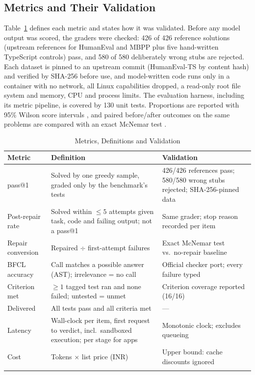 \documentclass[pdflatex,sn-mathphys-num]{sn-jnl}%
\newcommand{\fix}[1]{{\color{fixcol}#1}}
\theoremstyle{thmstyleone}%
\theoremstyle{thmstyletwo}%
\theoremstyle{thmstylethree}%
\begin{document}
\subsection{Metrics and Their Validation}\label{sec8.2}

Table~\ref{tab3} defines each metric and states how it was validated. Before any model output was scored, the graders were checked: 426 of 426 reference solutions (upstream references for HumanEval and MBPP plus five hand-written TypeScript controls) pass, and 580 of 580 deliberately wrong stubs are rejected. Each dataset is pinned to an upstream commit \fix{(HumanEval-TS by content hash)} and verified by SHA-256 before use, and model-written code runs only in a container with no network, all Linux capabilities dropped, a read-only root file system and memory, CPU and process limits. The evaluation harness, including its metric pipeline, is covered by 130 unit tests. Proportions are reported with 95\% Wilson score intervals \cite{r31wilson}, and paired before/after outcomes on the same problems are compared with an exact McNemar test \cite{r32mcnemar}.%

\begin{table}[t]
\caption{Metrics, Definitions and Validation}\label{tab3}%
\small
\begin{tabular*}{\textwidth}{@{\extracolsep\fill}p{2.2cm}p{5.2cm}p{4.3cm}@{}}
\toprule
\raggedright{}\textbf{Metric} & \raggedright{}\textbf{Definition} & \raggedright{}\textbf{Validation}\tabularnewline
\midrule
\raggedright{}pass@1 & \raggedright{}Solved by one greedy sample, graded only by the benchmark's tests & \raggedright{}426/426 references pass; 580/580 wrong stubs rejected; SHA-256-pinned data\tabularnewline
\raggedright{}Post-repair rate & \raggedright{}Solved within $\leq 5$ attempts given task, code and failing output; not a pass@1 & \raggedright{}Same grader; stop reason recorded per item\tabularnewline
\raggedright{}Repair conversion & \raggedright{}Repaired $\div$ first-attempt failures & \raggedright{}Exact McNemar test vs.\ no-repair baseline\tabularnewline
\raggedright{}BFCL accuracy & \raggedright{}Call matches a possible answer (AST); irrelevance = no call & \raggedright{}Official checker port; every failure typed\tabularnewline
\raggedright{}Criterion met & \raggedright{}$\geq 1$ tagged test ran and none failed; untested = unmet & \raggedright{}Criterion coverage reported (16/16)\tabularnewline
\raggedright{}Delivered & \raggedright{}All tests pass and all criteria met & \raggedright{}---\tabularnewline
\raggedright{}Latency & \raggedright{}Wall-clock per item, first request to verdict, incl.\ sandboxed execution; per stage for apps & \raggedright{}Monotonic clock; excludes queueing\tabularnewline
\raggedright{}Cost & \raggedright{}Tokens $\times$ list price (INR) & \raggedright{}Upper bound: cache discounts ignored\tabularnewline
\botrule
\end{tabular*}
\end{table}
\end{document}
